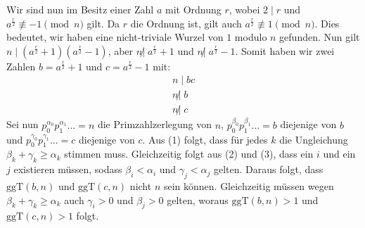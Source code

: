 Wir sind nun im Besitz einer Zahl $a$ mit Ordnung $r$, wobei $2 \mid r$ und $a^\frac{r}{2} \not\equiv -1 \pmod{n}$ gilt. Da $r$ die Ordnung ist, gilt auch $a^\frac{r}{2} \not\equiv 1 \pmod{n}$. Dies bedeutet, wir haben eine nicht-triviale Wurzel von $1$ modulo $n$ gefunden. Nun gilt $n \mid (a^\frac{r}{2} + 1)(a^\frac{r}{2} - 1)$, aber $n \not| \; a^\frac{r}{2} + 1$ und $n \not| \; a^\frac{r}{2} - 1$. Somit haben wir zwei Zahlen $b = a^\frac{r}{2} + 1$ und $c = a^\frac{r}{2} - 1$ mit:
\begin{align}
    n \mid bc \label{eq:1} \\
    n \not| \; b \label{eq:2} \\
    n \not| \; c \label{eq:3}
\end{align}    
Sei nun $p_0^{\alpha_0}p_1^{\alpha_1}... = n$ die Primzahlzerlegung von $n$, $p_0^{\beta_0}p_1^{\beta_1}... = b$ diejenige von $b$ und $p_0^{\gamma_0}p_1^{\gamma_1}... = c$ diejenige von $c$. Aus (1) folgt, dass für jedes $k$ die Ungleichung $\beta_k + \gamma_k \geq \alpha_k$ stimmen muss. Gleichzeitig folgt aus (2) und (3), dass ein $i$ und ein $j$ existieren müssen, sodass $\beta_i < \alpha_i$ und $\gamma_j < \alpha_j$ gelten. Daraus folgt, dass $\text{ggT}(b, n)$ und $\text{ggT}(c, n)$ nicht $n$ sein können. Gleichzeitig müssen wegen $\beta_k + \gamma_k \geq \alpha_k$ auch $\gamma_i > 0$ und $\beta_j > 0$ gelten, woraus $\text{ggT}(b, n) > 1$ und $\text{ggT}(c, n) > 1$ folgt.
